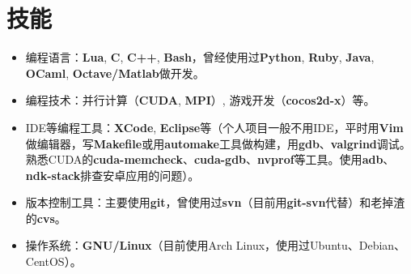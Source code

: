 \documentclass[letterpaper]{article}
\begin{document}


\section*{技能}
\begin{itemize}
    \item 编程语言：\textbf{Lua}, \textbf{C}, \textbf{C++}, \textbf{Bash}，曾经使用过\textbf{Python}, \textbf{Ruby}, \textbf{Java}, \textbf{OCaml}, \textbf{Octave/Matlab}做开发。
    \item 编程技术：并行计算（\textbf{CUDA}, \textbf{MPI}）, 游戏开发（\textbf{cocos2d-x}）等。
    \item IDE等编程工具：\textbf{XCode}, \textbf{Eclipse}等（个人项目一般不用IDE，平时用\textbf{Vim}做编辑器，写\textbf{Makefile}或用\textbf{automake}工具做构建，用\textbf{gdb}、\textbf{valgrind}调试。熟悉CUDA的\textbf{cuda-memcheck}、\textbf{cuda-gdb}、\textbf{nvprof}等工具。使用\textbf{adb}、\textbf{ndk-stack}排查安卓应用的问题）。
    \item 版本控制工具：主要使用\textbf{git}，曾使用过\textbf{svn}（目前用\textbf{git-svn}代替）和老掉渣的\textbf{cvs}。
    \item 操作系统：\textbf{GNU/Linux}（目前使用Arch Linux，使用过Ubuntu、Debian、CentOS）。
\end{itemize}
\end{document}
